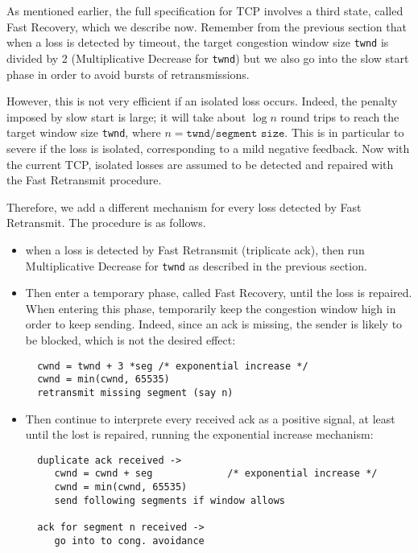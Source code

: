 As mentioned earlier, the full specification for TCP involves a third
state, called Fast Recovery, which we describe now.  Remember from the
previous section that when a loss is detected by timeout, the target congestion
window size \texttt{twnd} is divided by 2 (Multiplicative Decrease
for \texttt{twnd}) but we also go into the slow start phase in order
to avoid bursts of retransmissions.

However, this is not very efficient if an isolated loss occurs.
Indeed, the penalty imposed by slow start is large; it will take
about $\log n$ round trips to reach the target window size
\texttt{twnd}, where $n = \texttt{twnd} / \texttt{segment size}$.
This is in particular to severe if the loss is isolated, corresponding
to a mild negative feedback. Now with the current TCP, isolated losses
are assumed to be detected and repaired with the Fast Retransmit
procedure.

Therefore, we add a different mechanism for
every loss detected by  Fast Retransmit. The procedure is as follows.

\begin{itemize}
        \item  when a loss is detected by Fast Retransmit (triplicate ack),
        then run Multiplicative Decrease for \texttt{twnd} as described in
        the previous section.

        \item  Then enter a temporary phase, called  Fast Recovery,
        until the loss is repaired.
        When entering this phase, temporarily
        keep  the congestion
        window high in order to keep sending. Indeed, since an ack is missing, the
        sender is likely to be blocked, which is not the desired effect:

        \begin{verbatim}
  cwnd = twnd + 3 *seg /* exponential increase */
  cwnd = min(cwnd, 65535)
  retransmit missing segment (say n)
    \end{verbatim}

        \item Then continue to interprete every received ack as a positive signal,
        at least until the lost is repaired, running the exponential increase
        mechanism:

        \begin{verbatim}
  duplicate ack received ->
     cwnd = cwnd + seg             /* exponential increase */
     cwnd = min(cwnd, 65535)
     send following segments if window allows

  ack for segment n received ->
     go into to cong. avoidance

        \end{verbatim}

\end{itemize}

